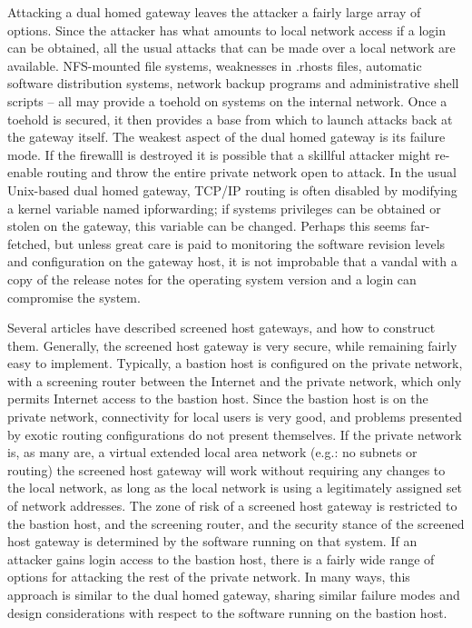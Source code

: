 \begin{htmllist}
    Attacking a dual homed gateway leaves the attacker a fairly large array
    of options. Since the attacker has what amounts to local network access
    if a login can be obtained, all the usual attacks that can be made over
    a local network are available. NFS-mounted file systems, weaknesses in
    .rhosts files, automatic software distribution systems, network backup
    programs and administrative shell scripts -- all may provide a toehold
    on systems on the internal network. Once a toehold is secured, it then
    provides a base from which to launch attacks back at the gateway
    itself. The weakest aspect of the dual homed gateway is its failure
    mode. If the firewalll is destroyed it is possible that a skillful
    attacker might re-enable routing and throw the entire private network
    open to attack. In the usual Unix-based dual homed gateway, TCP/IP
    routing is often disabled by modifying a kernel variable named
    ipforwarding; if systems privileges can be obtained or stolen on the
    gateway, this variable can be changed. Perhaps this seems far-fetched,
    but unless great care is paid to monitoring the software revision
    levels and configuration on the gateway host, it is not improbable that
    a vandal with a copy of the release notes for the operating system
    version and a login can compromise the system.


    \label{scr_hst}
    
    Several articles have described screened host gateways, and how to
    construct them. Generally, the screened host gateway is very secure,
    while remaining fairly easy to implement. Typically, a bastion host is
    configured on the private network, with a screening router between the
    Internet and the private network, which only permits Internet access to
    the bastion host. Since the bastion host is on the private network,
    connectivity for local users is very good, and problems presented by
    exotic routing configurations do not present themselves. If the private
    network is, as many are, a virtual extended local area network (e.g.:
    no subnets or routing) the screened host gateway will work without
    requiring any changes to the local network, as long as the local
    network is using a legitimately assigned set of network addresses. The
    zone of risk of a screened host gateway is restricted to the bastion
    host, and the screening router, and the security stance of the screened
    host gateway is determined by the software running on that system. If
    an attacker gains login access to the bastion host, there is a fairly
    wide range of options for attacking the rest of the private network. In
    many ways, this approach is similar to the dual homed gateway, sharing
    similar failure modes and design considerations with respect to the
    software running on the bastion host.



\end{htmllist}
